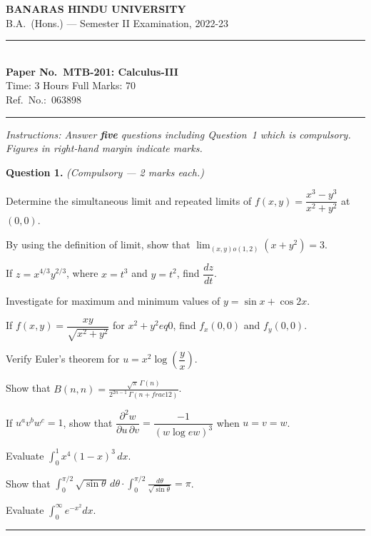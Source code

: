 \documentclass[11pt,a4paper]{article}
\begin{document}
\begin{center}
  {\large\bfseries BANARAS HINDU UNIVERSITY}\\[2pt]
  {\normalsize B.A.\ (Hons.) --- Semester II Examination, 2022-23}\\[6pt]
  \rule{0.8\linewidth}{0.5pt}\\[6pt]
  {\large\bfseries Paper No.\ MTB-201: Calculus-III}\\[4pt]
  {\normalsize Time: 3 Hours \hfill Full Marks: 70}\\[2pt]
  {\small Ref.\ No.:\ 063898}
\end{center}
\rule{\linewidth}{0.4pt}
\smallskip



\noindent   \textit{Instructions: Answer   \textbf{five} questions including Question~1 which is compulsory. Figures in right-hand margin indicate marks.}
\bigskip




\noindent   \textbf{Question 1.}   \textit{(Compulsory --- 2 marks each.)}

\begin{parts}
  \item Determine the simultaneous limit and repeated limits of $f(x,y)=\dfrac{x^3-y^3}{x^2+y^2}$ at $(0,0)$.
  \item By using the definition of limit, show that $\displaystyle\lim_{(x,y) o(1,2)}(x+y^2)=3$.
  \item If $z=x^{4/3}y^{2/3}$, where $x=t^3$ and $y=t^2$, find $\dfrac{dz}{dt}$.
  \item Investigate for maximum and minimum values of $y=\sin x+\cos 2x$.
  \item If $f(x,y)=\dfrac{xy}{\sqrt{x^2+y^2}}$ for $x^2+y^2
eq0$, find $f_x(0,0)$ and $f_y(0,0)$.
  \item Verify Euler's theorem for $u=x^2\log\!\left(\dfrac{y}{x}\right)$.
  \item Show that $\displaystyle B(n,n)=\frac{\sqrt{\pi}\,\Gamma(n)}{2^{2n-1}\,\Gamma\!\left(n+ frac{1}{2}\right)}$.
  \item If $u^a v^b w^c=1$, show that $\dfrac{\partial^2 w}{\partial u\,\partial v}=\dfrac{-1}{(w\log e w)^3}$ when $u=v=w$.
  \item Evaluate $\displaystyle\int_0^1 x^4(1-x)^3\,dx$.
  \item Show that $\displaystyle\int_0^{\pi/2}\sqrt{\sin \theta}\,d \theta\cdot\int_0^{\pi/2}\frac{d \theta}{\sqrt{\sin \theta}}=\pi$.
  \item Evaluate $\displaystyle\int_0^{\infty}e^{-x^2}dx$.
\end{parts}
\medskip\rule{\linewidth}{0.2pt}
\end{document}
